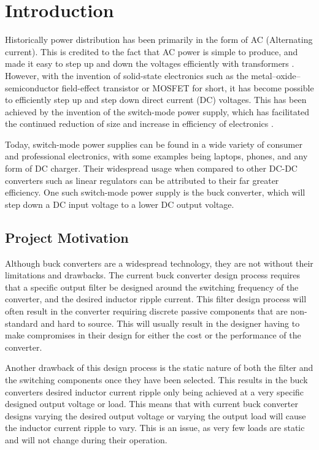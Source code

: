 \chapter{Introduction}\label{C:intro}

Historically power distribution has been primarily in the form of AC (Alternating current). This is credited to the fact that AC power is simple to produce, and made it easy to step up and down the voltages efficiently with transformers \cite{Earley2013}. However, with the invention of solid-state electronics such as the metal–oxide–semiconductor field-effect transistor or MOSFET for short, it has become possible to efficiently step up and step down direct current (DC) voltages. This has been achieved by the invention of the switch-mode power supply, which has facilitated the continued reduction of size and increase in efficiency of electronics \cite{Bocock}.

Today, switch-mode power supplies can be found in a wide variety of consumer and professional electronics, with some examples being laptops, phones, and any form of DC charger. Their widespread usage when compared to other DC-DC converters such as linear regulators can be attributed to their far greater efficiency. One such switch-mode power supply is the buck converter, which will step down a DC input voltage to a lower DC output voltage.

\section{Project Motivation}

Although buck converters are a widespread technology, they are not without their limitations and drawbacks. The current buck converter design process requires that a specific output filter be designed around the switching frequency of the converter, and the desired inductor ripple current. This filter design process will often result in the converter requiring discrete passive components that are non-standard and hard to source. This will usually result in the designer having to make compromises in their design for either the cost or the performance of the converter.

Another drawback of this design process is the static nature of both the filter and the switching components once they have been selected. This results in the buck converters desired inductor current ripple only being achieved at a very specific designed output voltage or load. This means that with current buck converter designs varying the desired output voltage or varying the output load will cause the inductor current ripple to vary. This is an issue, as very few loads are static and will not change during their operation. 

